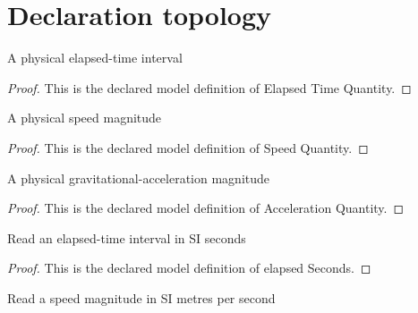 \section{Declaration topology}
\begin{definition}
  \label{def:physics:phyx-mini-0691:phyxminiproblems-problemphyxmini0691-elapsedtimequantity}
  A physical elapsed-time interval
\end{definition}
\begin{proof}
  This is the declared model definition of Elapsed Time Quantity.
\end{proof}
\begin{definition}
  \label{def:physics:phyx-mini-0691:phyxminiproblems-problemphyxmini0691-speedquantity}
  A physical speed magnitude
\end{definition}
\begin{proof}
  This is the declared model definition of Speed Quantity.
\end{proof}
\begin{definition}
  \label{def:physics:phyx-mini-0691:phyxminiproblems-problemphyxmini0691-accelerationquantity}
  A physical gravitational-acceleration magnitude
\end{definition}
\begin{proof}
  This is the declared model definition of Acceleration Quantity.
\end{proof}
\begin{definition}
  \label{def:physics:phyx-mini-0691:phyxminiproblems-problemphyxmini0691-elapsedseconds}
  Read an elapsed-time interval in SI seconds
\end{definition}
\begin{proof}
  This is the declared model definition of elapsed Seconds.
\end{proof}
\begin{definition}
  \label{def:physics:phyx-mini-0691:phyxminiproblems-problemphyxmini0691-speedinmeterspersecond}
  Read a speed magnitude in SI metres per second
\end{definition}
